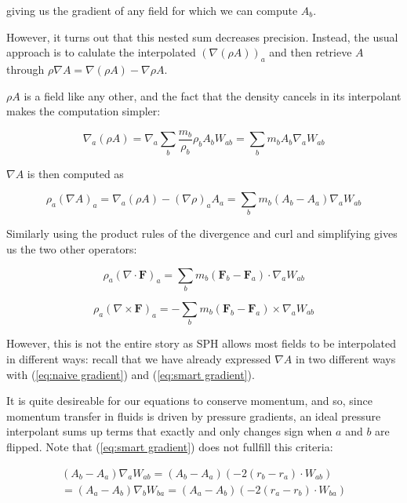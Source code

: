 \documentclass[../main.tex]{subfiles}
\begin{document}
giving us the gradient of any field for which we can compute $A_b$.

However, it turns out \autocite{monaghan1992} that this nested sum decreases precision. Instead, the
usual approach is to calulate the interpolated $(\nabla(\rho A))_a$ and then retrieve $A$ through
$\rho\nabla A = \nabla(\rho A) - \nabla\rho A$.

$\rho A$ is a field like any other, and the fact that the density cancels in its interpolant makes
the computation simpler:

\begin{equation}
    \nabla_a (\rho A)
    = \nabla_a \sum_b \frac{m_b}{\rho_b} \rho_b A_b W_{ab}
    = \sum_b m_b A_b \nabla_a W_{ab}
\end{equation}

$\nabla A$ is then computed as

\begin{equation} \label{eq:smart gradient}
    \rho_a (\nabla A)_a
    = \nabla_a (\rho A) - (\nabla\rho)_a A_a
    = \sum_b m_b (A_b - A_a) \nabla_a W_{ab}
\end{equation}

Similarly using the product rules of the divergence and curl and simplifying gives us the two other
operators:

\begin{equation} \label{eq:divergence interpolant}
    \rho_a (\nabla\cdot\bm{F})_a
    = \sum_b m_b (\bm{F}_b - \bm{F}_a) \cdot \nabla_a W_{ab}
\end{equation}

\begin{equation}
    \rho_a (\nabla\times\bm{F})_a
    = - \sum_b m_b (\bm{F}_b - \bm{F}_a) \times \nabla_a W_{ab}
\end{equation}

However, this is not the entire story as SPH allows most fields to be interpolated in different
ways: recall that we have already expressed $\nabla A$ in two different ways with
(\ref{eq:naive gradient}) and
(\ref{eq:smart gradient}).

It is quite desireable for our equations to conserve momentum, and so, since momentum transfer in
fluids is driven by pressure gradients, an ideal pressure interpolant sums up terms that exactly and
only changes sign when $a$ and $b$ are flipped. Note that (\ref{eq:smart gradient}) does not fullfill this
criteria:

\begin{equation}
\begin{split}
    (A_b - A_a) \nabla_a W_{ab} = (A_b - A_a) (-2(r_b - r_a) \cdot W_{ab}) \\
  = (A_a - A_b) \nabla_b W_{ba} = (A_a - A_b) (-2(r_a - r_b) \cdot W_{ba})
\end{split}
\end{equation}
\end{document}
